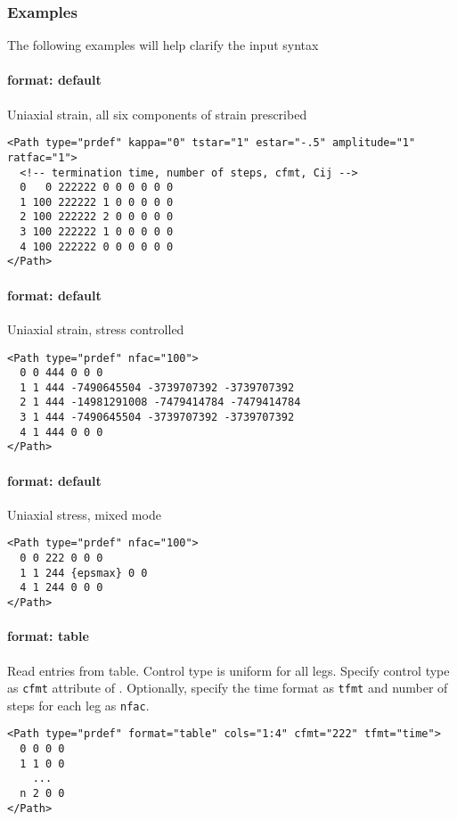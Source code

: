 \documentclass[11pt]{report}
\newcommand{\reqdtag}[1]{\Red{\texttt{<#1>}}}
\begin{document}
\subsubsection{Examples}
The following examples will help clarify the \reqdtag{Path} input syntax

\paragraph{format: default} Uniaxial strain, all six components of strain prescribed
\begin{verbatim}
<Path type="prdef" kappa="0" tstar="1" estar="-.5" amplitude="1" ratfac="1">
  <!-- termination time, number of steps, cfmt, Cij -->
  0   0 222222 0 0 0 0 0 0
  1 100 222222 1 0 0 0 0 0
  2 100 222222 2 0 0 0 0 0
  3 100 222222 1 0 0 0 0 0
  4 100 222222 0 0 0 0 0 0
</Path>
\end{verbatim}

\paragraph{format: default} Uniaxial strain, stress controlled
\begin{verbatim}
<Path type="prdef" nfac="100">
  0 0 444 0 0 0
  1 1 444 -7490645504 -3739707392 -3739707392
  2 1 444 -14981291008 -7479414784 -7479414784
  3 1 444 -7490645504 -3739707392 -3739707392
  4 1 444 0 0 0
</Path>
\end{verbatim}

\paragraph{format: default} Uniaxial stress, mixed mode
\begin{verbatim}
<Path type="prdef" nfac="100">
  0 0 222 0 0 0
  1 1 244 {epsmax} 0 0
  4 1 244 0 0 0
</Path>
\end{verbatim}

\paragraph{format: table} Read entries from table. Control type is uniform for
all legs. Specify control type as \texttt{cfmt} attribute of \reqdtag{Path}.
Optionally, specify the time format as \texttt{tfmt} and number of steps for
each leg as \texttt{nfac}.
\begin{verbatim}
<Path type="prdef" format="table" cols="1:4" cfmt="222" tfmt="time">
  0 0 0 0
  1 1 0 0
    ...
  n 2 0 0
</Path>
\end{verbatim}
\end{document}
